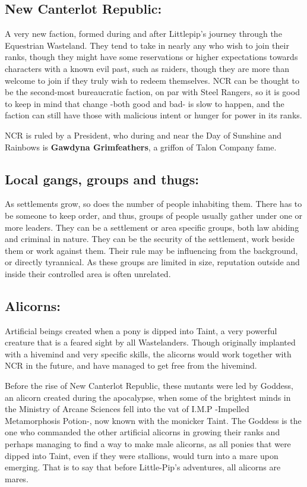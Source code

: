 \documentclass[11pt,a4paper,twocolumn]{book}
\begin{document}
    
    \subsection*{New Canterlot Republic:}
    A very new faction, formed during and after Littlepip's journey through the Equestrian Wasteland. They tend to take in nearly any who wish to join their ranks, though they might have some reservations or higher expectations towards characters with a known evil past, such as raiders, though they are more than welcome to join if they truly wish to redeem themselves. NCR can be thought to be the second-most bureaucratic faction, on par with Steel Rangers, so it is good to keep in mind that change -both good and bad- is slow to happen, and the faction can still have those with malicious intent or hunger for power in its ranks. 
    
    NCR is ruled by a President, who during and near the Day of Sunshine and Rainbows is \textbf{Gawdyna Grimfeathers}, a griffon of Talon Company fame.
    
    \subsection*{Local gangs, groups and thugs:}
    As settlements grow, so does the number of people inhabiting them. There has to be someone to keep order, and thus, groups of people usually gather under one or more leaders. They can be a settlement or area specific groups, both law abiding and criminal in nature. They can be the security of the settlement, work beside them or work against them. Their rule may be influencing from the background, or directly tyrannical. As these groups are limited in size, reputation outside and inside their controlled area is often unrelated.
    
    \subsection*{Alicorns:}
    Artificial beings created when a pony is dipped into Taint, a very powerful creature that is a feared sight by all Wastelanders. Though originally implanted with a hivemind and very specific skills, the alicorns would work together with NCR in the future, and have managed to get free from the hivemind.
    
    Before the rise of New Canterlot Republic, these mutants were led by Goddess, an alicorn created during the apocalypse, when some of the brightest minds in the Ministry of Arcane Sciences fell into the vat of I.M.P -Impelled Metamorphosis Potion-, now known with the monicker Taint. The Goddess is the one who commanded the other artificial alicorns in growing their ranks and perhaps managing to find a way to make male alicorns, as all ponies that were dipped into Taint, even if they were stallions, would turn into a mare upon emerging. That is to say that before Little-Pip's adventures, all alicorns are mares.
    
\end{document}
